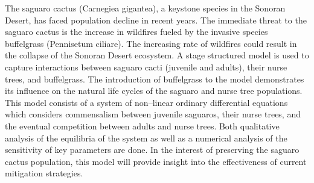 
\begin{tcolorbox}[
enhanced jigsaw,
fonttitle=\bfseries,
opacitytitle=1,
title=Abstract,
opacityframe=0.5,
opacityback=0.25,
opacitybacktitle=0.25,
opacitytext=1,
colframe=red!5!black,
colbacktitle=black!30!red
]
\small
{}
The saguaro cactus (Carnegiea gigantea), a keystone species in the Sonoran Desert, has faced population decline in recent years. The immediate threat to the saguaro cactus is the increase in wildfires fueled by the invasive species buffelgrass (Pennisetum ciliare). The increasing rate of wildfires could result in the collapse of the Sonoran Desert ecosystem. A stage structured model is used to capture interactions between saguaro cacti (juvenile and adults), their nurse trees, and buffelgrass. The introduction of buffelgrass to the model demonstrates its influence on the natural life cycles of the saguaro and nurse tree populations. This model consists of a system of non--linear ordinary differential equations which considers commensalism between juvenile saguaros, their nurse trees, and the eventual competition between adults and nurse trees. Both qualitative analysis of the equilibria of the system as well as a numerical analysis of the sensitivity of key parameters are done. In the interest of preserving the saguaro cactus population, this model will provide insight into the effectiveness of current mitigation strategies. 
\end{tcolorbox}
